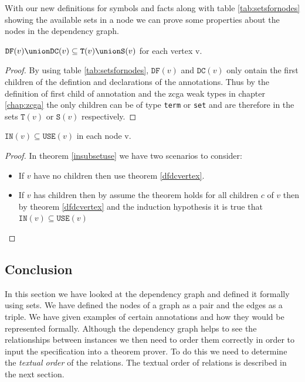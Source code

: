 With our new definitions for symbols and facts along with table \ref{tab:setsfornodes} showing the available sets in a node we can prove some properties about the nodes in the dependency graph.

\begin{thm}
\label{dfdcvertex}
$\mathtt{DF}(v) \union \mathtt{DC}(v) \subseteq \mathtt{T}(v) \union \mathtt{S}(v)$ for each vertex v.
\end{thm}

\begin{proof}
By using table \ref{tab:setsfornodes}, $\mathtt{DF}(v)$ and $\mathtt{DC}(v)$ only ontain the first children of the defintion and declarations of the annotations. Thus by the definition of first child of annotation and the \gls{zcga} weak types in chapter \ref{chap:zcga} the only children can be of type \texttt{term} or \texttt{set} and are therefore in the sets $\mathtt{T}(v)$ or $\mathtt{S}(v)$ respectively.
\end{proof}

\begin{thm}
\label{insubsetuse}
$\mathtt{IN}(v) \subseteq \mathtt{USE}(v)$ in each node v.
\end{thm}

\begin{proof}
In theorem \ref{insubsetuse} we have two scenarios to consider:

\begin{itemize}
\item If $v$ have no children then use theorem \ref{dfdcvertex}.

\item If $v$ has children then by assume the theorem holds for all children $c$ of $v$ then by theorem \ref{dfdcvertex} and the induction hypothesis it is true that $\mathtt{IN}(v) \subseteq \mathtt{USE}(v)$
\end{itemize}
\end{proof}


\subsection{Conclusion}

In this section we have looked at the dependency graph and defined it formally using sets. We have defined the nodes of a graph as a pair and the edges as a triple. We have given examples of certain annotations and how they would be represented formally. Although the dependency graph helps to see the relationships between instances we then need to order them correctly in order to input the specification into a theorem prover. To do this we need to determine the \emph{textual order} of the relations. The textual order of relations is described in the next section.

